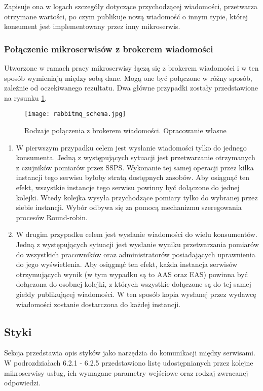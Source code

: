 Zapisuje ona w logach szczegóły dotyczące przychodzącej wiadomości, przetwarza 
otrzymane wartości, po czym publikuje nową wiadomość o innym typie, której konsument 
jest implementowany przez inny mikroserwis.

\subsubsection{Połączenie mikroserwisów z brokerem wiadomości}

Utworzone w ramach pracy mikroserwisy łączą się z brokerem wiadomości i w ten sposób wymieniają między
sobą dane. Mogą one być połączone w różny sposób, zależnie od oczekiwanego rezultatu. Dwa główne
przypadki zostały przedstawione na rysunku \ref{fig:rabbitmq-polaczenie}.

\begin{figure}[h]
    \centering
    \texttt{[image: rabbitmq\_schema.jpg]}
    \caption{Rodzaje połączenia z brokerem wiadomości. Opracowanie własne}
    \label{fig:rabbitmq-polaczenie}
\end{figure}

\begin{enumerate}
    \item W pierwszym przypadku celem jest wysłanie wiadomości tylko do jednego konsumenta. Jedną
    z występujących sytuacji jest przetwarzanie otrzymanych z czujników pomiarów przez SSPS. 
    Wykonanie tej samej operacji przez kilka instancji tego serwisu byłoby stratą
    dostępnych zasobów. Aby osiągnąć ten efekt, wszystkie instancje tego serwisu powinny być dołączone 
    do jednej kolejki. Wtedy kolejka wysyła przychodzące pomiary tylko do wybranej przez siebie instancji.
    Wybór odbywa się za pomocą mechanizmu szeregowania procesów Round-robin.
    \item W drugim przypadku celem jest wysłanie wiadomości do wielu konsumentów. Jedną z występujących
    sytuacji jest wysłanie wyniku przetwarzania pomiarów do wszystkich pracowników oraz administratorów
    posiadających uprawnienia do jego wyświetlenia. Aby osiągnąć ten efekt, każda instancja serwisów
    otrzymujących wynik (w tym wypadku są to AAS oraz EAS)
    powinna być dołączona do osobnej kolejki, z których wszystkie dołączone są do tej samej giełdy
    publikującej wiadomości. W ten sposób kopia wysłanej przez wydawcę wiadomości zostanie dostarczona
    do każdej instancji.
\end{enumerate}

\subsection{Styki}
Sekcja przedstawia opis styków jako narzędzia do komunikacji między serwisami.
W podrozdziałach 6.2.1 - 6.2.5 przedstawiono
listę udostępnianych przez kolejne mikroserwisy usług, ich wymagane parametry wejściowe
oraz rodzaj zwracanej odpowiedzi.

